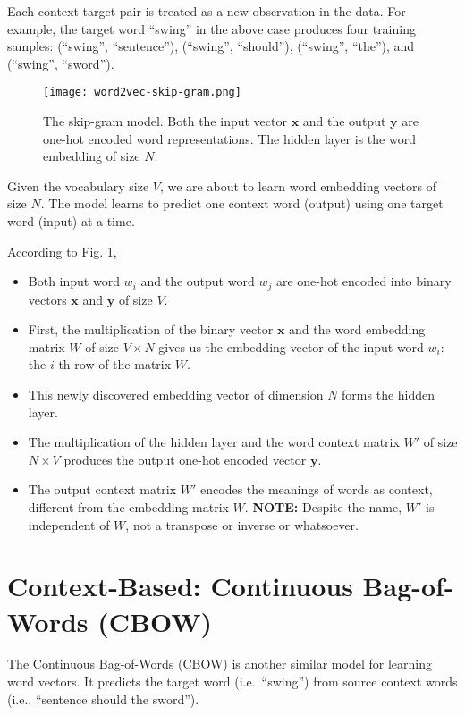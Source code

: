 Each context-target pair is treated as a new observation in the data. For example, the target word ``swing'' in the above case produces four training samples: (``swing'', ``sentence''), (``swing'', ``should''), (``swing'', ``the''), and (``swing'', ``sword'').

\begin{figure}[h]
    \centering
    \texttt{[image: word2vec-skip-gram.png]}
    \caption{The skip-gram model. Both the input vector $\mathbf{x}$ and the output $\mathbf{y}$ are one-hot encoded word representations. The hidden layer is the word embedding of size $N$.}
\end{figure}

Given the vocabulary size $V$, we are about to learn word embedding vectors of size $N$. The model learns to predict one context word (output) using one target word (input) at a time.

According to Fig. 1,
\begin{itemize}
    \item Both input word $w_i$ and the output word $w_j$ are one-hot encoded into binary vectors $\mathbf{x}$ and $\mathbf{y}$ of size $V$.
    \item First, the multiplication of the binary vector $\mathbf{x}$ and the word embedding matrix $W$ of size $V \times N$ gives us the embedding vector of the input word $w_i$: the $i$-th row of the matrix $W$.
    \item This newly discovered embedding vector of dimension $N$ forms the hidden layer.
    \item The multiplication of the hidden layer and the word context matrix $W'$ of size $N \times V$ produces the output one-hot encoded vector $\mathbf{y}$.
    \item The output context matrix $W'$ encodes the meanings of words as context, different from the embedding matrix $W$. \textbf{NOTE:} Despite the name, $W'$ is independent of $W$, not a transpose or inverse or whatsoever.
\end{itemize}

\section{Context-Based: Continuous Bag-of-Words (CBOW)}
The Continuous Bag-of-Words (CBOW) is another similar model for learning word vectors. It predicts the target word (i.e.\ ``swing'') from source context words (i.e., ``sentence should the sword'').

